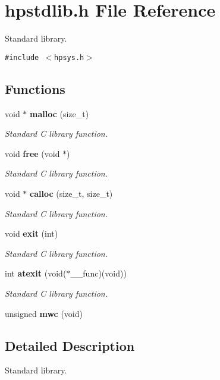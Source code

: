 \section{hpstdlib.h File Reference}
\label{hpstdlib_8h}
Standard library. 


{\tt \#include $<$hpsys.h$>$}\par
\subsection*{Functions}
\begin{CompactItemize}
\item 
void $\ast$ {\bf malloc} (size\_\-t)
\begin{CompactList}\small\item\em Standard C library function.\item\end{CompactList}\item 
void {\bf free} (void $\ast$)
\begin{CompactList}\small\item\em Standard C library function.\item\end{CompactList}\item 
void $\ast$ {\bf calloc} (size\_\-t, size\_\-t)
\begin{CompactList}\small\item\em Standard C library function.\item\end{CompactList}\item 
void {\bf exit} (int)
\begin{CompactList}\small\item\em Standard C library function.\item\end{CompactList}\item 
int {\bf atexit} (void($\ast$\_\-\_\-func)(void))
\begin{CompactList}\small\item\em Standard C library function.\item\end{CompactList}\item 
unsigned {\bf mwc} (void)
\end{CompactItemize}


\subsection{Detailed Description}
Standard library.





